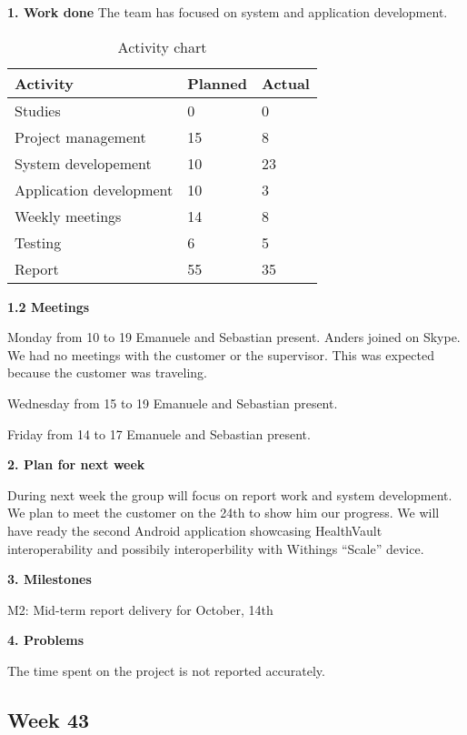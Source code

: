 \textbf{1. Work done}
The team has focused on system and application development.

\begin{table}[H]
\begin{center}
\begin{tabular}{ l | l | l }
  \hline
  Activity & Planned & Actual \\
  \hline\noalign{\smallskip}\noalign{\smallskip}\hline
  Studies & 0 & 0 \\
  Project management & 15 & 8 \\
  System developement & 10 & 23 \\
  Application development & 10 & 3 \\
  Weekly meetings & 14 & 8 \\
  Testing & 6 & 5 \\
  Report & 55 & 35 \\
  \hline
\end{tabular}
\end{center}
\caption{Activity chart}
\label{table:activityChartStatusReport}
\end{table}

\textbf{1.2 Meetings}

Monday from 10 to 19
Emanuele and Sebastian present. 
Anders joined on Skype.
We had no meetings with the customer or the supervisor.
This was expected because the customer was traveling.

Wednesday from 15 to 19
Emanuele and Sebastian present.

Friday from 14 to 17
Emanuele and Sebastian present.

\textbf{2. Plan for next week}

During next week the group will focus on report work and system development.
We plan to meet the customer on the 24th to show him our progress.
We will have ready the second Android application showcasing HealthVault interoperability and possibily interoperbility with Withings “Scale” device.

\textbf{3. Milestones}

M2: Mid-term report delivery for October, 14th

\textbf{4. Problems}

The time spent on the project is not reported accurately.


\newpage
\subsection{Week 43}

